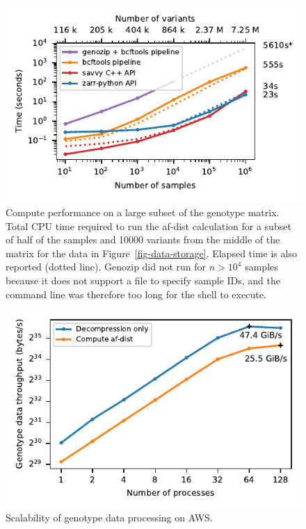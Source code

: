 \documentclass[a4paper,num-refs]{oup-contemporary}
\begin{document}
\begin{figure}[h]
\includegraphics{figures/subset-matrix-compute-supplemental}
\caption{Compute performance on a large subset of the genotype matrix.
Total CPU time required to run the af-dist calculation for
a subset of half of the samples and 10000 variants from the middle of the matrix
for the data in Figure~\ref{fig-data-storage}.
Elapsed time is also reported (dotted line).
Genozip did not run for
$n > 10^4$ samples because it does not support a file to specify
sample IDs, and the command line was therefore too long for the shell
to execute.
\label{fig-subset-matrix-compute-supplemental}}
\end{figure}

\begin{figure}[h]
\includegraphics{figures/s3-throughput}
\caption{Scalability of genotype data processing on AWS.
\label{fig-s3-throughput}}
\end{figure}
\end{document}
